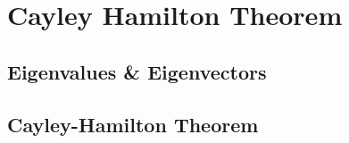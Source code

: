 \chapter{Cayley Hamilton Theorem}
\section{Eigenvalues \& Eigenvectors}
\section{Cayley-Hamilton Theorem}
